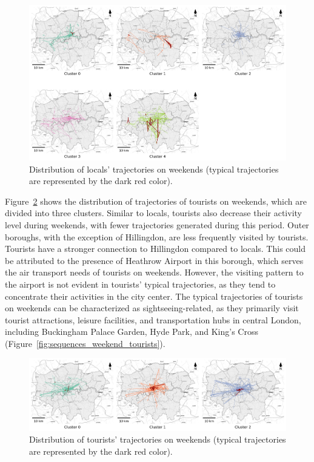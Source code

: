 \documentclass{article}
\theoremstyle{remark}
\begin{document}
\begin{figure}[!h]
\centering
\includegraphics[width=1\textwidth]{figures/traj_distribution_weekend_locals.png}
\caption{\label{fig:traj_distribution_weekend_locals}Distribution of locals' trajectories on weekends (typical trajectories are represented by the dark red color).}
\end{figure}


Figure~\ref{fig:traj_distribution_weekend_tourists} shows the distribution of trajectories of tourists on weekends, which are divided into three clusters. Similar to locals, tourists also decrease their activity level during weekends, with fewer trajectories generated during this period. Outer boroughs, with the exception of Hillingdon, are less frequently visited by tourists. Tourists have a stronger connection to Hillingdon compared to locals. This could be attributed to the presence of Heathrow Airport in this borough, which serves the air transport needs of tourists on weekends. However, the visiting pattern to the airport is not evident in tourists’ typical trajectories, as they tend to concentrate their activities in the city center. The typical trajectories of tourists on weekends can be characterized as sightseeing-related, as they primarily visit tourist attractions, leisure facilities, and transportation hubs in central London, including Buckingham Palace Garden, Hyde Park, and King's Cross (Figure~\ref{fig:sequences_weekend_tourists}).

\begin{figure}[!h]
\centering
\includegraphics[width=1\textwidth]{figures/traj_distribution_weekend_tourists.png}
\caption{\label{fig:traj_distribution_weekend_tourists}Distribution of tourists' trajectories on weekends (typical trajectories are represented by the dark red color).}
\end{figure}
\end{document}

